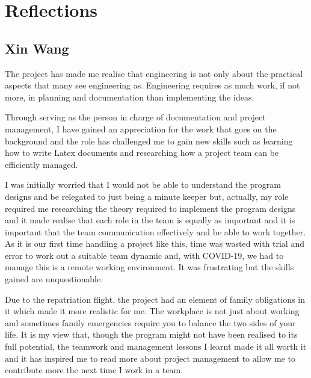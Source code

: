 \documentclass[12pt,a4paper]{article}
\begin{document}
\section{Reflections}
\subsection{Xin Wang}
The project has made me realise that engineering is not only about the practical aspects that many see engineering as. 
Engineering requires as much work, if not more, in planning and documentation than implementing the ideas. 
\par
Through serving as the person in charge of documentation and project management, I have gained an appreciation for the 
work that goes on the background and the role has challenged me to gain new skills such as learning how to write 
Latex documents and researching how a project team can be efficiently managed. 
\par 
I was initially worried that I would not be able to understand the program designs and be relegated to just being a 
minute keeper but, actually, my role required me researching the theory required to implement the program designs and it made 
realise that each role in the team is equally as important and it is important that the team communication effectively and 
be able to work together. As it is our first time handling a project like this, time was wasted with trial and error to work 
out a suitable team dynamic and, with COVID-19, we had to manage this is a remote working environment. It was frustrating but 
the skills gained are unquestionable.
\par 
Due to the repatriation flight, the project had an element of family obligations in it which made it 
more realistic for me. The workplace is not just about working and sometimes family emergencies require you to balance the 
two sides of your life. It is my view that, though the program might not have been realised to its full potential, the 
teamwork and management lessons I learnt made it all worth it and it has inspired me to read more about project management to 
allow me to contribute more the next time I work in a team. 
\end{document}
